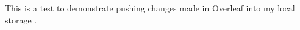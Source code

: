 \documentclass[../main.tex]{subfiles} %
\begin{document}
This is a test to demonstrate pushing changes made in Overleaf into my local storage \parencite{storer2023sweet}.  
\end{document}
